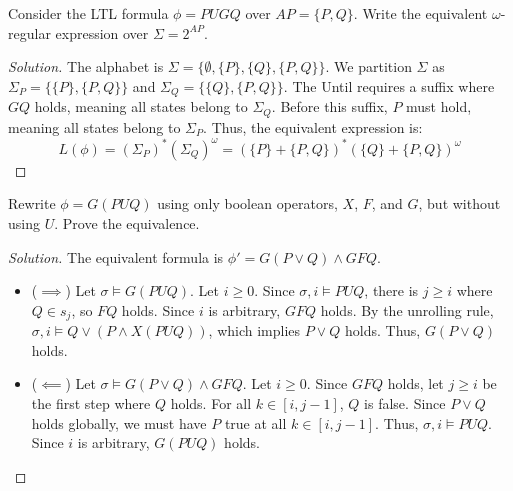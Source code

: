 \begin{chapex}
Consider the LTL formula $\phi = P U G Q$ over $AP = \{P, Q\}$. Write the equivalent $\omega$-regular expression over $\Sigma = 2^{AP}$.
\end{chapex}
\begin{proof}[Solution]
The alphabet is $\Sigma = \{\emptyset, \{P\}, \{Q\}, \{P,Q\}\}$. We partition $\Sigma$ as $\Sigma_P = \{\{P\}, \{P,Q\}\}$ and $\Sigma_Q = \{\{Q\}, \{P,Q\}\}$. 
The Until requires a suffix where $G Q$ holds, meaning all states belong to $\Sigma_Q$. Before this suffix, $P$ must hold, meaning all states belong to $\Sigma_P$. 
Thus, the equivalent expression is:
\[
  L(\phi) = (\Sigma_P)^* (\Sigma_Q)^\omega = (\{P\} + \{P,Q\})^* (\{Q\} + \{P,Q\})^\omega
\]
\end{proof}

\begin{chapex}
Rewrite $\phi = G (P U Q)$ using only boolean operators, $X$, $F$, and $G$, but without using $U$. Prove the equivalence.
\end{chapex}
\begin{proof}[Solution]
The equivalent formula is $\phi' = G(P \lor Q) \land G F Q$.
\begin{itemize}
    \item ($\implies$) Let $\sigma \models G(P U Q)$. Let $i \ge 0$. Since $\sigma, i \models P U Q$, there is $j \ge i$ where $Q \in s_j$, so $F Q$ holds. Since $i$ is arbitrary, $G F Q$ holds. By the unrolling rule, $\sigma, i \models Q \lor (P \land X(P U Q))$, which implies $P \lor Q$ holds. Thus, $G(P \lor Q)$ holds.
    \item ($\impliedby$) Let $\sigma \models G(P \lor Q) \land G F Q$. Let $i \ge 0$. Since $G F Q$ holds, let $j \ge i$ be the first step where $Q$ holds. For all $k \in [i, j-1]$, $Q$ is false. Since $P \lor Q$ holds globally, we must have $P$ true at all $k \in [i, j-1]$. Thus, $\sigma, i \models P U Q$. Since $i$ is arbitrary, $G(P U Q)$ holds.
\end{itemize}
\end{proof}
